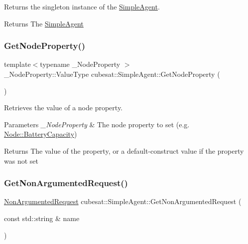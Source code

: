 Returns the singleton instance of the \hyperlink{classcubesat_1_1SimpleAgent}{Simple\+Agent}. 

\begin{DoxyReturn}{Returns}
The \hyperlink{classcubesat_1_1SimpleAgent}{Simple\+Agent} 
\end{DoxyReturn}
\mbox{\label{classcubesat_1_1SimpleAgent_a6bb98053dc51209a14907296ba1670f0}} 
\subsubsection{\texorpdfstring{Get\+Node\+Property()}{GetNodeProperty()}}
{\footnotesize\ttfamily template$<$typename \+\_\+\+Node\+Property $>$ \\
\+\_\+\+Node\+Property\+::\+Value\+Type cubesat\+::\+Simple\+Agent\+::\+Get\+Node\+Property (\begin{DoxyParamCaption}{ }\end{DoxyParamCaption})\hspace{0.3cm}{\ttfamily [inline]}}



Retrieves the value of a node property. 


\begin{DoxyParams}{Parameters}
{\em \+\_\+\+Node\+Property} & The node property to set (e.\+g. \hyperlink{structcubesat_1_1Node_1_1BatteryCapacity}{Node\+::\+Battery\+Capacity}) \\
\hline
\end{DoxyParams}
\begin{DoxyReturn}{Returns}
The value of the property, or a default-\/construct value if the property was not set 
\end{DoxyReturn}
\mbox{\label{classcubesat_1_1SimpleAgent_afc59dc5e0fae3f21da25a1bfa89e4758}} 
\subsubsection{\texorpdfstring{Get\+Non\+Argumented\+Request()}{GetNonArgumentedRequest()}}
{\footnotesize\ttfamily \hyperlink{namespacecubesat_a494b2feec3d999510e5772da5c0b354c}{Non\+Argumented\+Request} cubesat\+::\+Simple\+Agent\+::\+Get\+Non\+Argumented\+Request (\begin{DoxyParamCaption}\item[{const std\+::string \&}]{name }\end{DoxyParamCaption})\hspace{0.3cm}{\ttfamily [inline]}}



